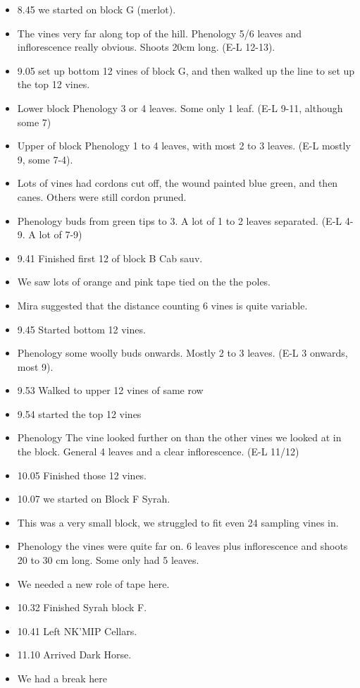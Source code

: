 \documentclass[11pt,letter]{article}
\newenvironment{smitemize}{
\begin{itemize}
  \setlength{\itemsep}{0pt}
  \setlength{\parskip}{0.8pt}
  \setlength{\parsep}{0pt}}
{\end{itemize}
}
\begin{document}
\begin{smitemize}
\item 8.45 we started on block G (merlot). 
\item The vines very far along top of the hill. Phenology 5/6 leaves and inflorescence really obvious. Shoots 20cm long. (E-L 12-13).
\item 9.05 set up bottom 12 vines of block G, and then walked up the line to set up the top 12 vines.
\item Lower block Phenology 3 or 4 leaves. Some only 1 leaf. (E-L 9-11, although some 7) 
\item Upper of block Phenology 1 to 4 leaves, with most 2 to 3 leaves. (E-L mostly 9, some 7-4).
\item Lots of vines had cordons cut off, the wound painted blue green, and then canes. Others were still cordon pruned. 
\item Phenology buds from green tips to 3. A lot of 1 to 2 leaves separated. (E-L 4-9. A lot of 7-9)
\item 9.41 Finished first 12 of block B Cab sauv.
\item We saw lots of orange and pink tape tied on the the poles.
\item Mira suggested that the distance counting 6 vines is quite variable.
\item 9.45 Started bottom 12 vines. 
\item Phenology some woolly buds onwards. Mostly 2 to 3 leaves. (E-L 3 onwards, most 9).
\item 9.53 Walked to upper 12 vines of same row 
\item 9.54 started the top 12 vines 
\item Phenology The vine looked further on than the other vines we looked at in the block. General 4 leaves and a clear inflorescence. (E-L 11/12) 
\item 10.05 Finished those 12 vines.
\item 10.07 we started on Block F Syrah.
\item This was a very small block, we struggled to fit even 24 sampling vines in. 
\item Phenology the vines were quite far on. 6 leaves plus inflorescence and shoots 20 to 30 cm long. Some only had 5 leaves. 
\item We needed a new role of tape here. 
\item 10.32 Finished Syrah block F.
\item 10.41 Left NK'MIP Cellars.
\item 11.10 Arrived Dark Horse. 
\item We had a break here 

\end{smitemize}
\end{document}
